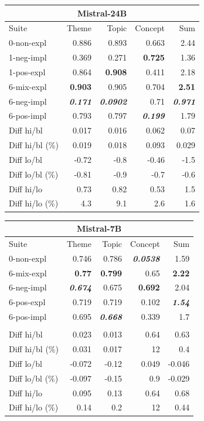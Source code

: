 \begin{table}
    \begin{tabular}{lrrrr}
    \toprule
    \multicolumn{5}{c}{\textbf{Mistral-24B}} \\
    \midrule
    Suite & Theme & Topic & Concept & Sum \\
    \midrule
    0-non-expl & 0.886 & 0.893 & 0.663 & 2.44 \\
    1-neg-impl & 0.369 & 0.271 & \bfseries 0.725 & 1.36 \\
    1-pos-expl & 0.864 & \bfseries 0.908 & 0.411 & 2.18 \\
    6-mix-expl & \bfseries 0.903 & 0.905 & 0.704 & \bfseries 2.51 \\
    6-neg-impl & \bfseries \itshape 0.171 & \bfseries \itshape 0.0902 & 0.71 & \bfseries \itshape 0.971 \\
    6-pos-impl & 0.793 & 0.797 & \bfseries \itshape 0.199 & 1.79 \\
    \midrule
    Diff hi/bl & 0.017 & 0.016 & 0.062 & 0.07 \\
    Diff hi/bl (\%) & 0.019 & 0.018 & 0.093 & 0.029 \\
    Diff lo/bl & -0.72 & -0.8 & -0.46 & -1.5 \\
    Diff lo/bl (\%) & -0.81 & -0.9 & -0.7 & -0.6 \\
    Diff hi/lo & 0.73 & 0.82 & 0.53 & 1.5 \\
    Diff hi/lo (\%) & 4.3 & 9.1 & 2.6 & 1.6 \\
    \bottomrule
    \end{tabular}
    \begin{tabular}{lrrrr}
    \toprule
    \multicolumn{5}{c}{\textbf{Mistral-7B}} \\
    \midrule
    Suite & Theme & Topic & Concept & Sum \\
    \midrule
    0-non-expl & 0.746 & 0.786 & \bfseries \itshape 0.0538 & 1.59 \\
    6-mix-expl & \bfseries 0.77 & \bfseries 0.799 & 0.65 & \bfseries 2.22 \\
    6-neg-impl & \bfseries \itshape 0.674 & 0.675 & \bfseries 0.692 & 2.04 \\
    6-pos-expl & 0.719 & 0.719 & 0.102 & \bfseries \itshape 1.54 \\
    6-pos-impl & 0.695 & \bfseries \itshape 0.668 & 0.339 & 1.7 \\
     & & & & \\
    \midrule
    Diff hi/bl & 0.023 & 0.013 & 0.64 & 0.63 \\
    Diff hi/bl (\%) & 0.031 & 0.017 & 12 & 0.4 \\
    Diff lo/bl & -0.072 & -0.12 & 0.049 & -0.046 \\
    Diff lo/bl (\%) & -0.097 & -0.15 & 0.9 & -0.029 \\
    Diff hi/lo & 0.095 & 0.13 & 0.64 & 0.68 \\
    Diff hi/lo (\%) & 0.14 & 0.2 & 12 & 0.44 \\
    \bottomrule
    \end{tabular}
    

\end{table}
